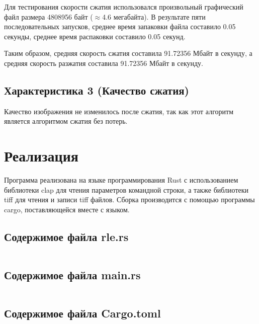 \documentclass[a4paper,oneside]{article}
\theoremstyle{definition}
\begin{document}
Для тестирования скорости сжатия использовался произвольный графический
файл размера 4808956 байт ($\approx$4.6 мегабайта). В результате пяти
последовательных запусков, среднее время запаковки файла составило 0.05
секунды, среднее время распаковки составило 0.05 секунд.

Таким образом, средняя скорость сжатия составила 91.72356 Мбайт в секунду, а
средняя скорость разжатия составила 91.72356 Мбайт в секунду.

\subsection{Характеристика 3 (Качество сжатия)}

Качество изображения не изменилось после сжатия, так как этот алгоритм является
алгоритмом сжатия без потерь.

\section{Реализация}

Программа реализована на языке программирования Rust с использованием библиотеки
clap для чтения параметров командной строки, а также библиотеки tiff для
чтения и записи tiff файлов. Сборка производится с помощью программы cargo,
поставляющейся вместе с языком.

\subsection{Содержимое файла rle.rs}
\inputminted{rust}{../../lab10/src/rle.rs}

\subsection{Содержимое файла main.rs}
\inputminted{rust}{../../lab10/src/main.rs}

\subsection{Содержимое файла Cargo.toml}
\inputminted{toml}{../../lab10/Cargo.toml}
\end{document}

